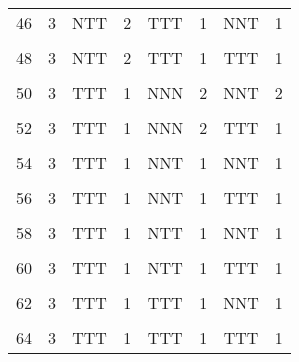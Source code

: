 \begin{table}[H]
{\begin{tabular}[t]{cccccccc}
			46 & 3 & NTT & 2 & TTT & 1 & NNT & 1\\
			\cellcolor{gray!6}{47} & \cellcolor{gray!6}{3} & \cellcolor{gray!6}{NTT} & \cellcolor{gray!6}{2} & \cellcolor{gray!6}{TTT} & \cellcolor{gray!6}{1} & \cellcolor{gray!6}{NTT} & \cellcolor{gray!6}{1}\\
			48 & 3 & NTT & 2 & TTT & 1 & TTT & 1\\
			\cellcolor{gray!6}{49} & \cellcolor{gray!6}{3} & \cellcolor{gray!6}{TTT} & \cellcolor{gray!6}{1} & \cellcolor{gray!6}{NNN} & \cellcolor{gray!6}{2} & \cellcolor{gray!6}{NNN} & \cellcolor{gray!6}{2}\\
			50 & 3 & TTT & 1 & NNN & 2 & NNT & 2\\
			\cellcolor{gray!6}{51} & \cellcolor{gray!6}{3} & \cellcolor{gray!6}{TTT} & \cellcolor{gray!6}{1} & \cellcolor{gray!6}{NNN} & \cellcolor{gray!6}{2} & \cellcolor{gray!6}{NTT} & \cellcolor{gray!6}{1}\\
			52 & 3 & TTT & 1 & NNN & 2 & TTT & 1\\
			\cellcolor{gray!6}{53} & \cellcolor{gray!6}{3} & \cellcolor{gray!6}{TTT} & \cellcolor{gray!6}{1} & \cellcolor{gray!6}{NNT} & \cellcolor{gray!6}{1} & \cellcolor{gray!6}{NNN} & \cellcolor{gray!6}{2}\\
			54 & 3 & TTT & 1 & NNT & 1 & NNT & 1\\
			\cellcolor{gray!6}{55} & \cellcolor{gray!6}{3} & \cellcolor{gray!6}{TTT} & \cellcolor{gray!6}{1} & \cellcolor{gray!6}{NNT} & \cellcolor{gray!6}{1} & \cellcolor{gray!6}{NTT} & \cellcolor{gray!6}{1}\\
			56 & 3 & TTT & 1 & NNT & 1 & TTT & 1\\
			\cellcolor{gray!6}{57} & \cellcolor{gray!6}{3} & \cellcolor{gray!6}{TTT} & \cellcolor{gray!6}{1} & \cellcolor{gray!6}{NTT} & \cellcolor{gray!6}{1} & \cellcolor{gray!6}{NNN} & \cellcolor{gray!6}{1}\\
			58 & 3 & TTT & 1 & NTT & 1 & NNT & 1\\
			\cellcolor{gray!6}{59} & \cellcolor{gray!6}{3} & \cellcolor{gray!6}{TTT} & \cellcolor{gray!6}{1} & \cellcolor{gray!6}{NTT} & \cellcolor{gray!6}{1} & \cellcolor{gray!6}{NTT} & \cellcolor{gray!6}{1}\\
			60 & 3 & TTT & 1 & NTT & 1 & TTT & 1\\
			\cellcolor{gray!6}{61} & \cellcolor{gray!6}{3} & \cellcolor{gray!6}{TTT} & \cellcolor{gray!6}{1} & \cellcolor{gray!6}{TTT} & \cellcolor{gray!6}{1} & \cellcolor{gray!6}{NNN} & \cellcolor{gray!6}{1}\\
			62 & 3 & TTT & 1 & TTT & 1 & NNT & 1\\
			\cellcolor{gray!6}{63} & \cellcolor{gray!6}{3} & \cellcolor{gray!6}{TTT} & \cellcolor{gray!6}{1} & \cellcolor{gray!6}{TTT} & \cellcolor{gray!6}{1} & \cellcolor{gray!6}{NTT} & \cellcolor{gray!6}{1}\\
			64 & 3 & TTT & 1 & TTT & 1 & TTT & 1\\
			\bottomrule
	\end{tabular}}
\end{table}

